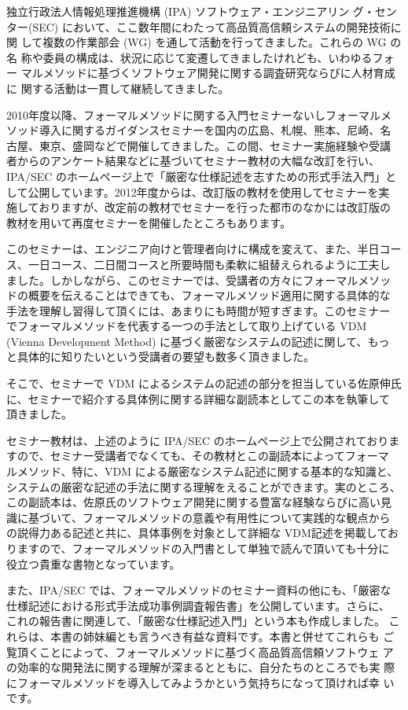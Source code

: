 独立行政法人情報処理推進機構 (IPA) ソフトウェア・エンジニアリン
グ・センター(SEC) において、ここ数年間にわたって高品質高信頼システムの開発技術に関
して複数の作業部会 (WG) を通して活動を行ってきました。これらの WG の名
称や委員の構成は、状況に応じて変遷してきましたけれども、いわゆるフォー
マルメソッドに基づくソフトウェア開発に関する調査研究ならびに人材育成に
関する活動は一貫して継続してきました。

2010年度以降、フォーマルメソッドに関する入門セミナーないしフォーマルメ
ソッド導入に関するガイダンスセミナーを国内の広島、札幌、熊本、尼崎、名
古屋、東京、盛岡などで開催してきました。この間、セミナー実施経験や受講
者からのアンケート結果などに基づいてセミナー教材の大幅な改訂を行い、
IPA/SEC のホームページ上で「厳密な仕様記述を志すための形式手法入門」と
して公開しています。2012年度からは、改訂版の教材を使用してセミナーを実
施しておりますが、改定前の教材でセミナーを行った都市のなかには改訂版の
教材を用いて再度セミナーを開催したところもあります。

このセミナーは、エンジニア向けと管理者向けに構成を変えて、また、半日コー
ス、一日コース、二日間コースと所要時間も柔軟に組替えられるように工夫し
ました。しかしながら、このセミナーでは、受講者の方々にフォーマルメソッ
ドの概要を伝えることはできても、フォーマルメソッド適用に関する具体的な
手法を理解し習得して頂くには、あまりにも時間が短すぎます。このセミナー
でフォーマルメソッドを代表する一つの手法として取り上げている VDM
(Vienna Development Method) に基づく厳密なシステムの記述に関して、もっ
と具体的に知りたいという受講者の要望も数多く頂きました。

そこで、セミナーで VDM によるシステムの記述の部分を担当している佐原伸氏
に、セミナーで紹介する具体例に関する詳細な副読本としてこの本を執筆して
頂きました。

セミナー教材は、上述のように IPA/SEC のホームページ上で公開されておりま
すので、セミナー受講者でなくても、その教材とこの副読本によってフォーマ
ルメソッド、特に、VDM による厳密なシステム記述に関する基本的な知識と、
システムの厳密な記述の手法に関する理解をえることができます。実のところ、
この副読本は、佐原氏のソフトウェア開発に関する豊富な経験ならびに高い見
識に基づいて、フォーマルメソッドの意義や有用性について実践的な観点から
の説得力ある記述と共に、具体事例を対象として詳細な VDM記述を掲載してお
りますので、フォーマルメソッドの入門書として単独で読んで頂いても十分に
役立つ貴重な書物となっています。

また、IPA/SEC では、フォーマルメソッドのセミナー資料の他にも、「厳密な
仕様記述における形式手法成功事例調査報告書」を公開しています。さらに、
これの報告書に関連して、「厳密な仕様記述入門」という本も作成しました。
これらは、本書の姉妹編とも言うべき有益な資料です。本書と併せてこれらも
ご覧頂くことによって、フォーマルメソッドに基づく高品質高信頼ソフトウェ
アの効率的な開発法に関する理解が深まるとともに、自分たちのところでも実
際にフォーマルメソッドを導入してみようかという気持ちになって頂ければ幸
いです。

\flushleft{ }
